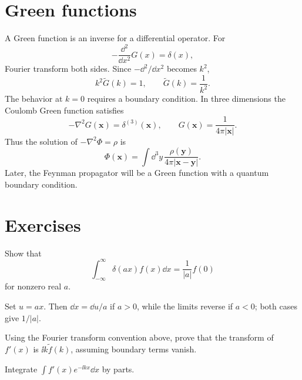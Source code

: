 \section{Green functions}

A Green function is an inverse for a differential operator.  For
\[
  -\frac{\dd^2}{\dd x^2}G(x)=\delta(x),
\]
Fourier transform both sides.  Since \(-\dd^2/\dd x^2\) becomes \(k^2\),
\[
  k^2\tilde G(k)=1,\qquad \tilde G(k)=\frac1{k^2}.
\]
The behavior at \(k=0\) requires a boundary condition.  In three dimensions the Coulomb Green function satisfies
\[
  -\nabla^2G(\bm x)=\delta^{(3)}(\bm x),
  \qquad
  G(\bm x)=\frac{1}{4\pi|\bm x|}.
\]
Thus the solution of \(-\nabla^2\Phi=\rho\) is
\[
  \Phi(\bm x)=\int\dd^3y\,\frac{\rho(\bm y)}{4\pi|\bm x-\bm y|}.
\]
Later, the Feynman propagator will be a Green function with a quantum boundary condition.

\section*{Exercises}

\begin{exercise}
Show that
\[
  \int_{-\infty}^{\infty}\delta(ax)f(x)\dd x=\frac1{|a|}f(0)
\]
for nonzero real \(a\).
\begin{answer}
Set \(u=ax\).  Then \(\dd x=\dd u/a\) if \(a>0\), while the limits reverse if \(a<0\); both cases give \(1/|a|\).
\end{answer}
\end{exercise}

\begin{exercise}
Using the Fourier transform convention above, prove that the transform of \(f'(x)\) is \(\ii k\tilde f(k)\), assuming boundary terms vanish.
\begin{answer}
Integrate \(\int f'(x)e^{-\ii kx}\dd x\) by parts.
\end{answer}
\end{exercise}
